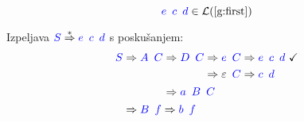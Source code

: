\documentclass{article}
\newcommand{\OK}{\ \checkmark}
\newcommand{\Symbol}[1]{\textcolor{blue}{#1}}
\newcommand{\Null}{\varepsilon}
\newcommand{\Language}[1]{\mathcal{L}(#1)}
\newcommand{\MathRef}[1]{\text{\ref{#1}}}
\newcommand{\Derive}{\Rightarrow}
\newcommand{\DeriveStar}{\overset{\ast}{\Rightarrow}}
\newcommand{\Seq}{{\ \,}}
\begin{document}
\begin{equation*}
  \Symbol{e} \Seq \Symbol{c} \Seq \Symbol{d} \in \Language{\MathRef{g:first}}
\end{equation*}

Izpeljava $\Symbol{S} \DeriveStar \Symbol{e} \Seq \Symbol{c} \Seq \Symbol{d}$ s poskušanjem:
\begin{equation*}
  \Symbol{S} \begin{aligned}[t]
    &\Derive \Symbol{A} \Seq \Symbol{C} \begin{aligned}[t]
      &\Derive \Symbol{D} \Seq \Symbol{C} \begin{aligned}[t]
        &\Derive \Symbol{e} \Seq \Symbol{C} \Derive \Symbol{e} \Seq \Symbol{c} \Seq \Symbol{d} \OK\\
        &\Derive \Null \Seq \Symbol{C} \Derive \Symbol{c} \Seq \Symbol{d}
      \end{aligned}\\
      &\Derive \Symbol{a} \Seq \Symbol{B} \Seq \Symbol{C}
    \end{aligned}\\
    &\Derive \Symbol{B} \Seq \Symbol{f} \Derive \Symbol{b} \Seq \Symbol{f}
  \end{aligned}
\end{equation*}
\end{document}
